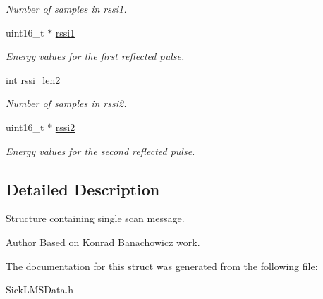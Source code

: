 \begin{DoxyCompactItemize}
\begin{DoxyCompactList}\small\item\em Number of samples in rssi1. \end{DoxyCompactList}\item 
\hypertarget{structpacpus_1_1__scanData_a01735a9729b0cff083092ca1e338c038}{uint16\-\_\-t $\ast$ \hyperlink{structpacpus_1_1__scanData_a01735a9729b0cff083092ca1e338c038}{rssi1}}\label{structpacpus_1_1__scanData_a01735a9729b0cff083092ca1e338c038}

\begin{DoxyCompactList}\small\item\em Energy values for the first reflected pulse. \end{DoxyCompactList}\item 
\hypertarget{structpacpus_1_1__scanData_abd15b50890c670b512a7f15862b1519d}{int \hyperlink{structpacpus_1_1__scanData_abd15b50890c670b512a7f15862b1519d}{rssi\-\_\-len2}}\label{structpacpus_1_1__scanData_abd15b50890c670b512a7f15862b1519d}

\begin{DoxyCompactList}\small\item\em Number of samples in rssi2. \end{DoxyCompactList}\item 
\hypertarget{structpacpus_1_1__scanData_a3ef8bb2c1b04d7e59d19481cc99da4c8}{uint16\-\_\-t $\ast$ \hyperlink{structpacpus_1_1__scanData_a3ef8bb2c1b04d7e59d19481cc99da4c8}{rssi2}}\label{structpacpus_1_1__scanData_a3ef8bb2c1b04d7e59d19481cc99da4c8}

\begin{DoxyCompactList}\small\item\em Energy values for the second reflected pulse. \end{DoxyCompactList}\end{DoxyCompactItemize}


\subsection{Detailed Description}
Structure containing single scan message. 

\begin{DoxyAuthor}{Author}
Based on Konrad Banachowicz work. 
\end{DoxyAuthor}


The documentation for this struct was generated from the following file\-:\begin{DoxyCompactItemize}
\item 
Sick\-L\-M\-S\-Data.\-h\end{DoxyCompactItemize}
